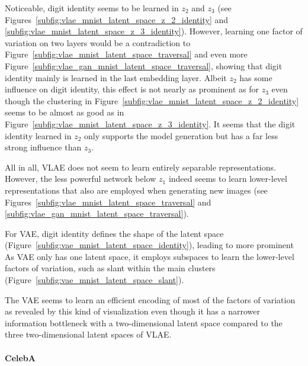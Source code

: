 Noticeable, digit identity seems to be learned in $z_2$ and $z_3$ (see Figures~\ref{subfig:vlae_mnist_latent_space_z_2_identity} and \ref{subfig:vlae_mnist_latent_space_z_3_identity}).
However, learning one factor of variation on two layers would be a contradiction to Figure~\ref{subfig:vlae_mnist_latent_space_traversal} and even more Figure~\ref{subfig:vlae_gan_mnist_latent_space_traversal}, showing that digit identity mainly is learned in the last embedding layer.
Albeit $z_2$ has some influence on digit identity, this effect is not nearly as prominent as for $z_3$ even though the clustering in Figure~\ref{subfig:vlae_mnist_latent_space_z_2_identity} seems to be almost as good as in Figure~\ref{subfig:vlae_mnist_latent_space_z_3_identity}.
It seems that the digit identity learned in $z_2$ only supports the model generation but has a far less strong influence than $z_3$.

All in all, \ac{VLAE} does not seem to learn entirely separable representations.
However, the less powerful network below $z_1$ indeed seems to learn lower-level representations that also are employed when generating new images (see Figures~\ref{subfig:vlae_mnist_latent_space_traversal} and \ref{subfig:vlae_gan_mnist_latent_space_traversal}).

For \ac{VAE}, digit identity defines the shape of the latent space (Figure~\ref{subfig:vae_mnist_latent_space_identity}), leading to more prominent 
As \ac{VAE} only has one latent space, it employs subspaces to learn the lower-level factors of variation, such as slant within the main clusters (Figure~\ref{subfig:vae_mnist_latent_space_slant}).

The \ac{VAE} seems to learn an efficient encoding of most of the factors of variation as revealed by this kind of visualization even though it has a narrower information bottleneck with a two-dimensional latent space compared to the three two-dimensional latent spaces of \ac{VLAE}.

\paragraph{CelebA}

